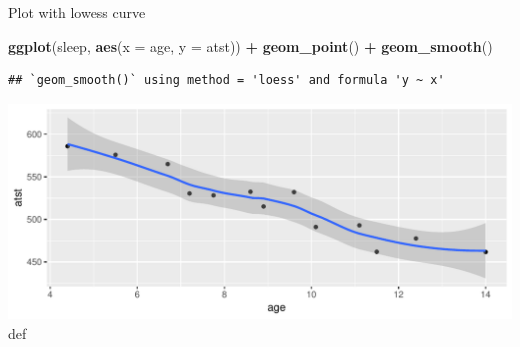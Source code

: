 \documentclass[ignorenonframetext,]{beamer}
\newenvironment{Shaded}{\begin{snugshade}}{\end{snugshade}}
\newcommand{\DataTypeTok}[1]{\textcolor[rgb]{0.13,0.29,0.53}{#1}}
\newcommand{\KeywordTok}[1]{\textcolor[rgb]{0.13,0.29,0.53}{\textbf{#1}}}
\newcommand{\NormalTok}[1]{#1}
\newcommand{\OperatorTok}[1]{\textcolor[rgb]{0.81,0.36,0.00}{\textbf{#1}}}
\newcommand{\StringTok}[1]{\textcolor[rgb]{0.31,0.60,0.02}{#1}}
\begin{document}
\begin{frame}[fragile]{Plot with lowess curve}
\protect\hypertarget{plot-with-lowess-curve}{}

\begin{Shaded}
\begin{Highlighting}[]
\KeywordTok{ggplot}\NormalTok{(sleep, }\KeywordTok{aes}\NormalTok{(}\DataTypeTok{x =}\NormalTok{ age, }\DataTypeTok{y =}\NormalTok{ atst)) }\OperatorTok{+}\StringTok{ }\KeywordTok{geom_point}\NormalTok{() }\OperatorTok{+}
\StringTok{  }\KeywordTok{geom_smooth}\NormalTok{()}
\end{Highlighting}
\end{Shaded}

\begin{verbatim}
## `geom_smooth()` using method = 'loess' and formula 'y ~ x'
\end{verbatim}

\includegraphics{figure/icko-1.pdf} def

\end{frame}
\end{document}
